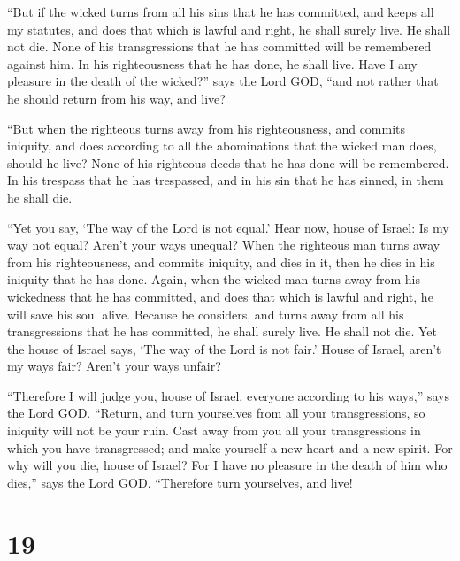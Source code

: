  ``But if the wicked turns from all his sins that he has
committed, and keeps all my statutes, and does that which is lawful and
right, he shall surely live. He shall not die.  None of his
transgressions that he has committed will be remembered against him. In
his righteousness that he has done, he shall live.  Have I
any pleasure in the death of the wicked?'' says the Lord GOD, ``and not
rather that he should return from his way, and live?

 ``But when the righteous turns away from his
righteousness, and commits iniquity, and does according to all the
abominations that the wicked man does, should he live? None of his
righteous deeds that he has done will be remembered. In his trespass
that he has trespassed, and in his sin that he has sinned, in them he
shall die.

 ``Yet you say, `The way of the Lord is not equal.' Hear
now, house of Israel: Is my way not equal? Aren't your ways unequal?
 When the righteous man turns away from his righteousness,
and commits iniquity, and dies in it, then he dies in his iniquity that
he has done.  Again, when the wicked man turns away from
his wickedness that he has committed, and does that which is lawful and
right, he will save his soul alive.  Because he considers,
and turns away from all his transgressions that he has committed, he
shall surely live. He shall not die.  Yet the house of
Israel says, `The way of the Lord is not fair.' House of Israel, aren't
my ways fair? Aren't your ways unfair?

 ``Therefore I will judge you, house of Israel, everyone
according to his ways,'' says the Lord GOD. ``Return, and turn
yourselves from all your transgressions, so iniquity will not be your
ruin.  Cast away from you all your transgressions in which
you have transgressed; and make yourself a new heart and a new spirit.
For why will you die, house of Israel?  For I have no
pleasure in the death of him who dies,'' says the Lord GOD. ``Therefore
turn yourselves, and live!

\hypertarget{section-17}{%
\section{19}\label{section-17}}

